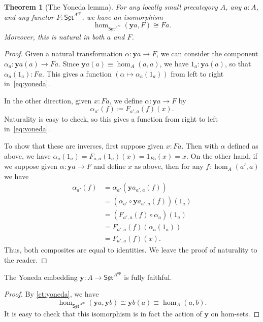 \documentclass{mscs}
\newcommand{\jdeq}{\equiv}      %
\newcommand{\defeq}{\coloneqq}  %
\renewcommand{\set}{\ensuremath{\mathsf{Set}}\xspace}
\newcommand{\uset}{\ensuremath{\underline{\set}}\xspace}
\newtheorem{thm}{Theorem}[section]
\numberwithin{equation}{section}
\newcommand{\op}{^{\textrm{op}}}
\newcommand{\y}{\ensuremath{\mathbf{y}}\xspace}
\begin{document}
\begin{thm}[The Yoneda lemma]\label{ct:yoneda}
  For any locally small precategory $A$, any $a:A$, and any functor $F:\uset^{A\op}$, we have an isomorphism
  \begin{equation}\label{eq:yoneda}
    \hom_{\uset^{A\op}}(\y a, F) \cong Fa.
  \end{equation}
  Moreover, this is natural in both $a$ and $F$.
\end{thm}
\begin{proof}
  Given a natural transformation $\alpha:\y a \to F$, we can consider the component $\alpha_a : \y a(a) \to F a$.
  Since $\y a(a)\jdeq \hom_A(a,a)$, we have $1_a : \y a(a)$, so that $\alpha_a(1_a) : F a$.
  This gives a function $(\alpha \mapsto \alpha_a(1_a))$ from left to right in~\eqref{eq:yoneda}.

  In the other direction, given $x:F a$, we define $\alpha:\y a \to F$ by
  \[\alpha_{a'}(f) \defeq F_{a',a}(f)(x). \]
  Naturality is easy to check, so this gives a function from right to left in~\eqref{eq:yoneda}.

  To show that these are inverses, first suppose given $x:F a$.
  Then with $\alpha$ defined as above, we have $\alpha_a(1_a) = F_{a,a}(1_a)(x) = 1_{F a}(x) = x$.
  On the other hand, if we suppose given $\alpha:\y a \to F$ and define $x$ as above, then for any $f:\hom_A(a',a)$ we have
  \begin{align*}
    \alpha_{a'}(f)
    &= \alpha_{a'} (\y a_{a',a}(f))\\
    &= (\alpha_{a'}\circ \y a_{a',a}(f))(1_a)\\
    &= (F_{a',a}(f)\circ \alpha_a)(1_a)\\
    &= F_{a',a}(f)(\alpha_a(1_a))\\
    &= F_{a',a}(f)(x).
  \end{align*}
  Thus, both composites are equal to identities.
  We leave the proof of naturality to the reader.
\end{proof}

\begin{cor}\label{ct:yoneda-embedding}
  The Yoneda embedding $\y :A\to \uset^{A\op}$ is fully faithful.
\end{cor}
\begin{proof}
  By \autoref{ct:yoneda}, we have
  \[ \hom_{\uset^{A\op}}(\y a, \y b) \cong \y b(a) \jdeq \hom_A(a,b). \]
  It is easy to check that this isomorphism is in fact the action of \y on hom-sets.
\end{proof}
\end{document}
